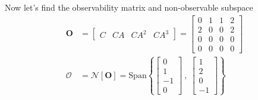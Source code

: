\documentclass[twoside]{article}
\begin{document}
%
Now let's find the observability matrix and non-observable subspace
%
%
\begin{align*}
    \mathbf{O} &= \left[ \begin{array}{cccc} C & C A & C A^2 & C A^3 \end{array} \right] 
    =
    \left[ \begin{array}{cccc} 0 & 1 & 1 & 2 \\ 
    2 & 0 & 0 & 2 \\ 
    0 & 0 & 0 & 0 \\ 
    0 & 0 & 0 & 0 
    \end{array} \right] 
    \\
    \mathbf{\mathcal{O}} &= \mathcal{N}[ \mathbf{O} ] = \mathrm{Span} \left\lbrace 
    \left[ \begin{array}{c} 0 \\  1 \\  -1 \\  0  \end{array} \right] 
    \ , \
    \left[ \begin{array}{c} 1 \\  2 \\  0 \\  -1  \end{array} \right] 
    \right\rbrace
\end{align*}
%
\end{document}
